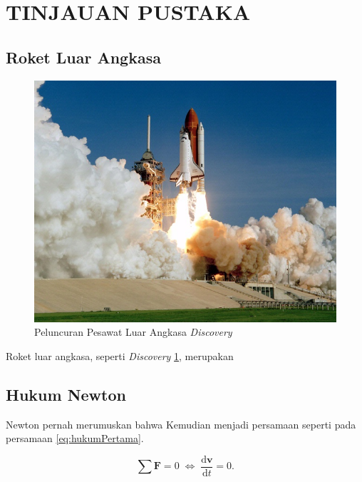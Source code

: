 \section{TINJAUAN PUSTAKA}


\subsection{Roket Luar Angkasa}

\begin{figure} [ht] \centering
	\includegraphics[scale=0.45]{gambar/space-shuttle.jpg}
	\caption{Peluncuran Pesawat Luar Angkasa \emph{Discovery}}
	\label{fig:spaceShuttle}
\end{figure}

Roket luar angkasa, seperti \emph{Discovery} \ref{fig:spaceShuttle}, merupakan \lipsum[2]

\subsection{Hukum Newton}

Newton pernah merumuskan \citep{newtonLaw} bahwa \lipsum[2]
Kemudian menjadi persamaan seperti pada persamaan \ref{eq:hukumPertama}.

\begin{equation}
  \label{eq:hukumPertama}
  \sum \mathbf{F} = 0\; \Leftrightarrow\; \frac{\mathrm{d} \mathbf{v} }{\mathrm{d}t} = 0.
\end{equation}